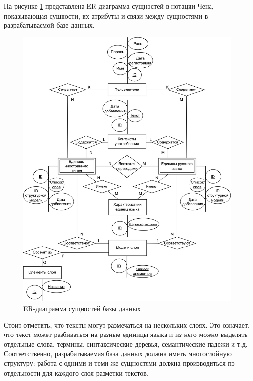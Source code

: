 На рисунке \ref{fig:er} представлена ER-диаграмма сущностей в нотации Чена, показывающая сущности, их атрибуты и связи между сущностями в разрабатываемой базе данных.

\begin{figure}[h]
	\centering
	\includegraphics[width=\textwidth ]{img/ER/ER.drawio.png}
	\caption{ER-диаграмма сущностей базы данных}
	\label{fig:er}
\end{figure} 

\clearpage

Стоит отметить, что тексты могут размечаться на нескольких слоях. Это означает, что текст может разбиваться на разные единицы языка и из него можно выделять отдельные слова, термины, синтаксические деревья, семантические падежи и т.д. Соответственно, разрабатываемая база данных должна иметь многослойную структуру: работа с одними и теми же сущностями должна производиться по отдельности для каждого слоя разметки текстов.




